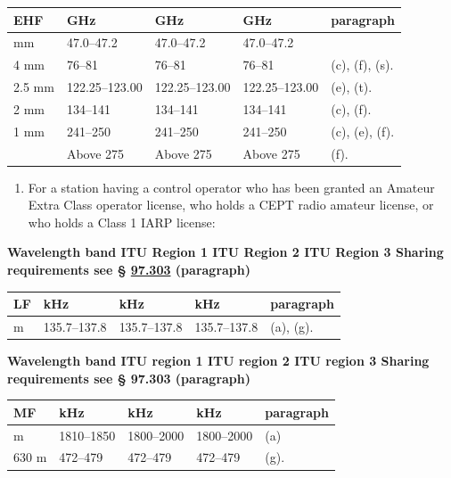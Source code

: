 \documentclass[
  letterpaper,
  DIV=11,
  numbers=noendperiod]{scrreport}
\providecommand{\tightlist}{%
  \setlength{\itemsep}{0pt}\setlength{\parskip}{0pt}}\usepackage{longtable,booktabs,array}
\begin{document}
\begin{longtable}[]{@{}lllll@{}}
\toprule\noalign{}
EHF & GHz & GHz & GHz & paragraph \\
\midrule\noalign{}
\endhead
\bottomrule\noalign{}
\endlastfoot
6 mm & 47.0--47.2 & 47.0--47.2 & 47.0--47.2 & \\
4 mm & 76--81 & 76--81 & 76--81 & (c), (f), (s). \\
2.5 mm & 122.25--123.00 & 122.25--123.00 & 122.25--123.00 & (e), (t). \\
2 mm & 134--141 & 134--141 & 134--141 & (c), (f). \\
1 mm & 241--250 & 241--250 & 241--250 & (c), (e), (f). \\
& Above 275 & Above 275 & Above 275 & (f). \\
\end{longtable}

\begin{enumerate}
\def\labelenumi{(\alph{enumi})}
\setcounter{enumi}{1}
\tightlist
\item
  For a station having a control operator who has been granted an
  Amateur Extra Class operator license, who holds a CEPT radio amateur
  license, or who holds a Class 1 IARP license:
\end{enumerate}

\textbf{Wavelength band ITU Region 1 ITU Region 2 ITU Region 3 Sharing
requirements see § \protect\hyperlink{97.303}{97.303} (paragraph)}

\begin{longtable}[]{@{}lllll@{}}
\toprule\noalign{}
LF & kHz & kHz & kHz & paragraph \\
\midrule\noalign{}
\endhead
\bottomrule\noalign{}
\endlastfoot
2200 m & 135.7--137.8 & 135.7--137.8 & 135.7--137.8 & (a), (g). \\
\end{longtable}

\textbf{Wavelength band ITU region 1 ITU region 2 ITU region 3 Sharing
requirements see § 97.303 (paragraph)}

\begin{longtable}[]{@{}lllll@{}}
\toprule\noalign{}
MF & kHz & kHz & kHz & paragraph \\
\midrule\noalign{}
\endhead
\bottomrule\noalign{}
\endlastfoot
160 m & 1810--1850 & 1800--2000 & 1800--2000 & (a) \\
630 m & 472--479 & 472--479 & 472--479 & (g). \\
\end{longtable}
\end{document}
